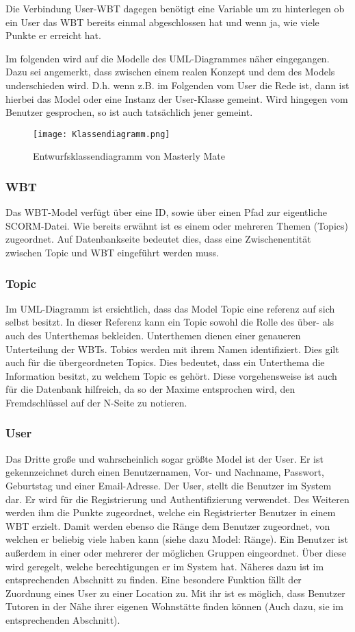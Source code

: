 Die Verbindung User-WBT dagegen benötigt eine Variable um zu hinterlegen ob ein
User das WBT bereits einmal abgeschlossen hat und wenn ja, wie viele Punkte er
erreicht hat. 

Im folgenden wird auf die Modelle des UML-Diagrammes näher
eingegangen. Dazu sei angemerkt, dass zwischen einem realen Konzept und dem
des Models underschieden wird. D.h. wenn z.B. im Folgenden vom User die Rede
ist, dann ist hierbei das Model oder eine Instanz der User-Klasse gemeint. Wird
hingegen vom Benutzer gesprochen, so ist auch tatsächlich jener gemeint.

\begin{figure}[ht]
\centering
\texttt{[image: Klassendiagramm.png]}
\caption{Entwurfsklassendiagramm von Masterly Mate}\label{ref:picKlassendia}
\end{figure}

\subsubsection{WBT}\label{ref:objectWBT}
Das WBT-Model verfügt über eine ID, sowie über einen Pfad zur eigentliche
SCORM-Datei. Wie bereits erwähnt ist es einem oder mehreren Themen (Topics)
zugeordnet. Auf Datenbankseite bedeutet dies, dass eine Zwischenentität zwischen
Topic und WBT eingeführt werden muss. 

\subsubsection{Topic}
Im UML-Diagramm ist ersichtlich, dass das Model Topic eine referenz auf sich
selbst besitzt. In dieser Referenz kann ein Topic sowohl die Rolle des über- als
auch des Unterthemas bekleiden. Unterthemen dienen einer genaueren Unterteilung
der WBTs. Tobics werden mit ihrem Namen identifiziert. Dies gilt auch für die
übergeordneten Topics. Dies bedeutet, dass ein Unterthema die Information
besitzt, zu welchem Topic es gehört. Diese vorgehensweise ist auch für die
Datenbank hilfreich, da so der Maxime entsprochen wird, den Fremdschlüssel auf
der N-Seite zu notieren.

\subsubsection{User}
Das Dritte große und wahrscheinlich sogar größte Model ist der User. Er ist
gekennzeichnet durch einen Benutzernamen, Vor- und Nachname, Passwort,
Geburtstag und einer Email-Adresse. Der User, stellt die Benutzer im System dar.
Er wird für die Registrierung und Authentifizierung verwendet. Des Weiteren
werden ihm die Punkte zugeordnet, welche ein Registrierter Benutzer in einem WBT
erzielt. Damit werden ebenso die Ränge dem Benutzer zugeordnet, von welchen er
beliebig viele haben kann (siehe dazu Model: Ränge). 
Ein Benutzer ist außerdem in einer oder mehrerer der möglichen Gruppen
eingeordnet.
Über diese wird geregelt, welche berechtigungen er im System hat. Näheres dazu
ist im entsprechenden Abschnitt zu finden.
Eine besondere Funktion fällt der Zuordnung eines User zu einer Location zu. Mit
ihr ist es möglich, dass Benutzer Tutoren in der Nähe ihrer eigenen Wohnstätte
finden können (Auch dazu, sie im entsprechenden Abschnitt).


